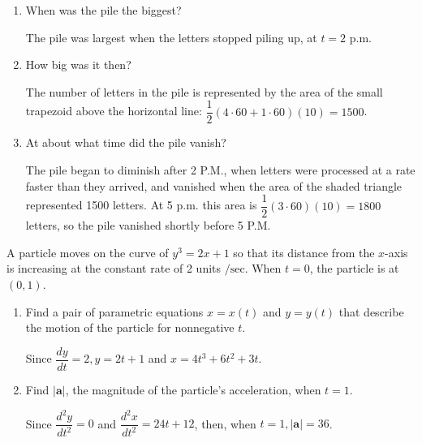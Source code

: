 \begin{enumerate}
\begin{enumerate}
\item When was the pile the biggest?
\begin{solutionorbox}[1in]
The pile was largest when the letters stopped piling up, at $t=2$ p.m.
\end{solutionorbox}

\item How big was it then?
\begin{solutionorbox}[1in]
The number of letters in the pile is represented by the area of the small trapezoid above the horizontal line: $\dfrac{1}{2}(4 \cdot 60+1 \cdot 60)(10)=1500$.
\end{solutionorbox}

\item At about what time did the pile vanish?
\begin{solutionorbox}[1.5in]
The pile began to diminish after 2 P.M., when letters were processed at a rate faster than they arrived, and vanished when the area of the shaded triangle represented 1500 letters. At 5 p.m. this area is $\dfrac{1}{2}(3 \cdot 60)(10)=1800$ letters, so the pile vanished shortly before 5 P.M.
\end{solutionorbox}
\end{enumerate}
\end{enumerate}




\newpage




\question
A particle moves on the curve of $y^{3}=2 x+1$ so that its distance from the $x$-axis is increasing at the constant rate of 2 units $/ \mathrm{sec}$. When $t=0$, the particle is at $(0,1)$.
\begin{enumerate}
\renewcommand{\labelenumi}{(\alph{enumi})}
\item Find a pair of parametric equations $x=x(t)$ and $y=y(t)$ that describe the motion of the particle for nonnegative $t$.
\begin{solutionorbox}[1in]
Since $\dfrac{d y}{d t}=2, y=2 t+1$ and $x=4 t^{3}+6 t^{2}+3 t$.
\end{solutionorbox}
\item Find $|\mathbf{a}|$, the magnitude of the particle's acceleration, when $t=1$.
\begin{solutionorbox}[1in]
Since $\dfrac{d^{2} y}{d t^{2}}=0$ and $\dfrac{d^{2} x}{d t^{2}}=24 t+12$, then, when $t=1,|\mathbf{a}|=36$.
\end{solutionorbox}
\end{enumerate}



